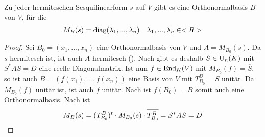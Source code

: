 \begin{theorem}[Hauptachsentransformation]
	Zu jeder hermiteschen Sesquilinearform $s$ auf $V$ gibt es eine Orthonormalbasis $B$ von $V$, für die 
	\begin{align}
		M_B(s)=\operatorname{diag}(\lambda_1,...,\lambda_n)\quad\lambda_1,...,\lambda_n\in<R>\notag
	\end{align}
\end{theorem}
\begin{proof}
	Sei $B_0=(x_1,...,x_n)$ eine Orthonormalbasis von $V$ und $A=M_{B_0}(s)$. Da $s$ hermitesch ist, ist auch $A$ hermitesch (). Nach  gibt es deshalb $S\in\operatorname{U}_n(K)$ mit $S^*AS=D$ eine reelle Diagonalmatrix. Ist nun $f\in\operatorname{End}_K(V)$ mit $M_{B_0}(f)=\overline{S}$, so ist auch $B=(f(x_1),...,f(x_n))$ eine Basis von $V$ mit $T^B_{B_0}=\overline{S}$ unitär. Da $M_{B_0}(f)$ unitär ist, ist auch $f$ unitär. Nach  ist $f(B_0)=B$ somit auch eine Orthonormalbasis. Nach  ist 
	\begin{align}
		M_B(s)=(T^B_{B_0})^t\cdot M_{B_0}(s)\cdot \overline{T^B_{B_0}}=S^*AS=D\notag
	\end{align}
\end{proof}

